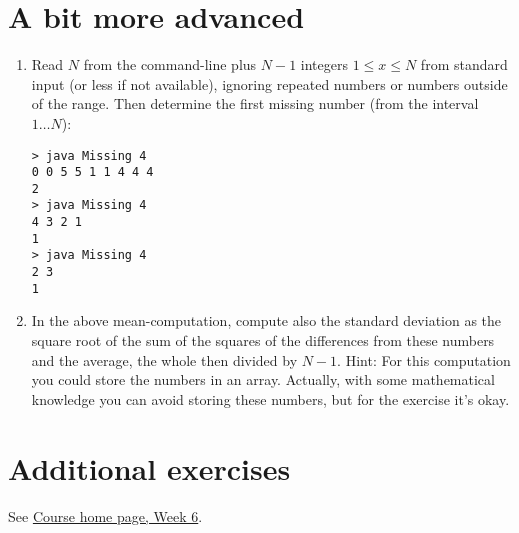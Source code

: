\documentclass[11pt]{article}
\begin{document}
\section{A bit more advanced}
\label{sec:advanced}

\begin{enumerate}
\item Read $N$ from the command-line plus $N-1$ integers $1 \le x \le N$ from standard input (or less if not available), ignoring repeated numbers or numbers outside of the range. Then determine the first missing number (from the interval $1 \dots N$):
\begin{verbatim}
> java Missing 4
0 0 5 5 1 1 4 4 4
2
> java Missing 4
4 3 2 1
1
> java Missing 4
2 3
1
\end{verbatim}
\item In the above mean-computation, compute also the standard deviation as the square root of the sum of the squares of the differences from these numbers and the average, the whole then divided by $N-1$. Hint: For this computation you could store the numbers in an array. Actually, with some mathematical knowledge you can avoid storing these numbers, but for the exercise it's okay.
\end{enumerate}


\section{Additional exercises}
\label{sec:addex}

See \href{\chp#ExercisesWeek06}{Course home page, Week 6}.
\end{document}
